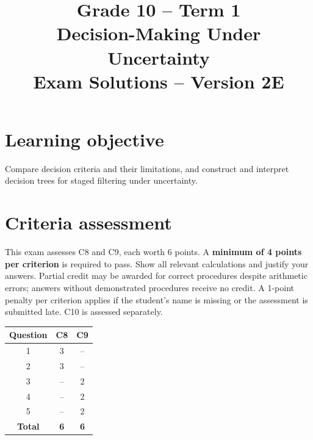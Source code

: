 \makeatletter
{}
\makeatother

\title{Grade 10 -- Term 1\\Decision-Making Under Uncertainty\\Exam Solutions -- Version 2E}
\author{}\date{}

\maketitle
\setcounter{tocdepth}{1}\setcounter{secnumdepth}{2}
\label{toc}\tableofcontents
\section*{Learning objective}
Compare decision criteria and their limitations, and construct and interpret decision trees for staged filtering under uncertainty.
\section*{Criteria assessment}
This exam assesses C8 and C9, each worth 6 points. A \textbf{minimum of 4 points per criterion} is required to pass. Show all relevant calculations and justify your answers. Partial credit may be awarded for correct procedures despite arithmetic errors; answers without demonstrated procedures receive no credit. A 1-point penalty per criterion applies if the student's name is missing or the assessment is submitted late. C10 is assessed separately.
\begin{center}
\begin{tabular}{|c|c|c|}
				\hline
				\textbf{Question} & \textbf{C8} & \textbf{C9} \\ \hline
				1 & 3 & -- \\ \hline
				2 & 3 & -- \\ \hline
				3 & -- & 2 \\ \hline
				4 & -- & 2 \\ \hline
				5 & -- & 2 \\ \hline
				\textbf{Total} & \textbf{6} & \textbf{6} \\ \hline
			\end{tabular}
\end{center}

